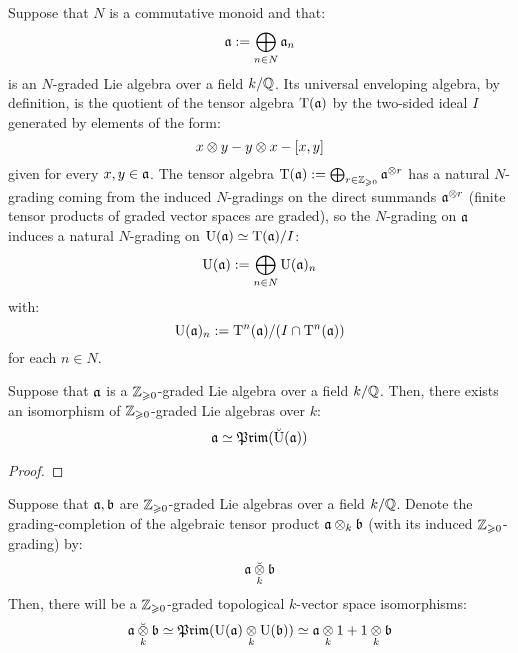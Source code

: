         \begin{remark} \label{remark: universal_enveloping_algebras_of_graded_lie_algebras}
            Suppose that $N$ is a commutative monoid and that:
                $$\mathfrak{a} := \bigoplus_{n \in N} \mathfrak{a}_n$$
            is an $N$-graded Lie algebra over a field $k/\mathbb{Q}$. Its universal enveloping algebra, by definition, is the quotient of the tensor algebra $\mathrm{T}(\mathfrak{a})$ by the two-sided ideal $I$ generated by elements of the form:
                $$x \tensor y - y \tensor x - [x, y]$$
            given for every $x, y \in \mathfrak{a}$. The tensor algebra $\rmT(\a) := \bigoplus_{r \in \Z_{\geq 0}} \a^{\tensor r}$ has a natural $N$-grading coming from the induced $N$-gradings on the direct summands $\a^{\tensor r}$ (finite tensor products of graded vector spaces are graded), so the $N$-grading on $\mathfrak{a}$ induces a natural $N$-grading on $\mathrm{U}(\mathfrak{a}) \simeq \mathrm{T}(\mathfrak{a})/I$:
                $$\mathrm{U}(\mathfrak{a}) := \bigoplus_{n \in N} \mathrm{U}(\mathfrak{a})_n$$
            with:
                $$\mathrm{U}(\mathfrak{a})_n := \mathrm{T}^n(\mathfrak{a})/( I \cap \mathrm{T}^n(\mathfrak{a}) )$$
            for each $n \in N$.
        \end{remark}
        \begin{lemma} \label{lemma: grading_completion_of_positively_graded_lie_algebras}
            Suppose that $\mathfrak{a}$ is a $\mathbb{Z}_{\geqslant 0}$-graded Lie algebra over a field $k/\mathbb{Q}$. Then, there exists an isomorphism of $\mathbb{Z}_{\geqslant 0}$-graded Lie algebras over $k$:
                $$\mathfrak{a} \simeq \mathfrak{Prim}( \breve{\mathrm{U}}(\mathfrak{a}) )$$
        \end{lemma}
            \begin{proof}
                
            \end{proof}
        \begin{proposition}
            Suppose that $\mathfrak{a}, \mathfrak{b}$ are $\mathbb{Z}_{\geqslant 0}$-graded Lie algebras over a field $k/\mathbb{Q}$. Denote the grading-completion of the algebraic tensor product $\a \tensor_k \b$ (with its induced $\mathbb{Z}_{\geqslant 0}$-grading) by:
                $$\a \brevetensor_k \b$$
            Then, there will be a $\mathbb{Z}_{\geqslant 0}$-graded topological $k$-vector space isomorphisms:
                $$\a \brevetensor_k \b \cong \Prim( \rmU(\a) \tensor_k \rmU(\b) ) \cong \a \tensor_k 1 + 1 \tensor_k \b$$
        \end{proposition}
